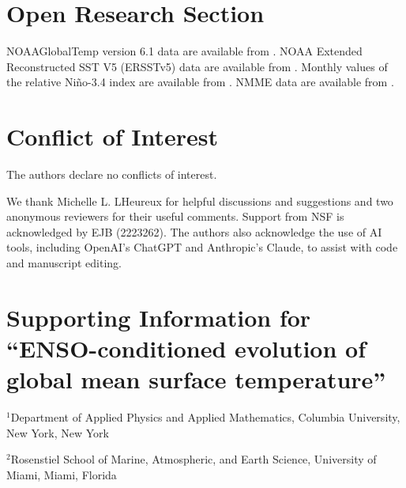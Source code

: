 \documentclass[draft]{agujournal2019}
\begin{document}
\section*{Open Research Section}
NOAAGlobalTemp version 6.1 data are available from
. NOAA Extended Reconstructed SST V5 (ERSSTv5) data are available from . %
Monthly values of the relative Ni\~no-3.4 index are available from . %
  NMME data are available from . %

\section*{Conflict of Interest}
The authors declare no conflicts of interest.

\acknowledgments
We thank Michelle L. L\textquotesingle Heureux for helpful discussions and suggestions and two anonymous reviewers for their useful comments. Support from NSF is acknowledged by EJB (2223262). The authors also acknowledge the use of AI tools, including OpenAI's ChatGPT and Anthropic's Claude, to assist with code and manuscript editing.


\clearpage
\setcounter{page}{1}

\section*{Supporting Information for ``ENSO-conditioned evolution of global mean surface temperature''}
\begin{center}
\noindent
{}

\noindent $^1${Department of Applied Physics and Applied Mathematics, Columbia University, New York, New York}

\noindent $^2${Rosenstiel School of Marine, Atmospheric, and Earth Science, University of Miami, Miami, Florida}

\end{center}
\end{document}
